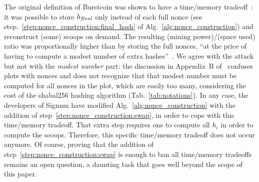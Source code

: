 The original definition of Burstcoin was shown to have a time/memory tradeoff~\cite{ParkKFGAP18}:
it was possible to store ${h_{\mathit{final}}}$ only instead of each full nonce
(see step.~\ref{step:nonce_construction:final_hash} of Alg.~\ref{alg:nonce_construction}) and
reconstruct (some) scoops on demand. The resulting (mining power)/(space used) ratio was proportionally higher
than by storing the full nonces,
``at the price of having to compute a modest number of extra hashes''~\cite{ParkKFGAP18}.
We agree with the attack but not with the \emph{modest number} part: the discussion in Appendix~B
of~\cite{ParkKFGAP18} confuses plots with nonces and does not recognize that that modest number
must be computed for all nonces in the plot, which are easily too many, considering the
cost of the shabal256 hashing algorithm (Tab.~\ref{tab:notations}). In any case, the developers
of Signum have modified Alg.~\ref{alg:nonce_construction} with the addition of
step~\ref{step:nonce_construction:swap}, in order to cope with this time/memory tradeoff.
That extra step requires one to compute all $h_i$ in order to compute the scoops.
Therefore, this specific time/memory tradeoff does not occur anymore. Of course, proving
that the addition of step~\ref{step:nonce_construction:swap} is enough to ban all
time/memory tradeoffs remains an open question,
a daunting task that goes well beyond the scope of this paper.

